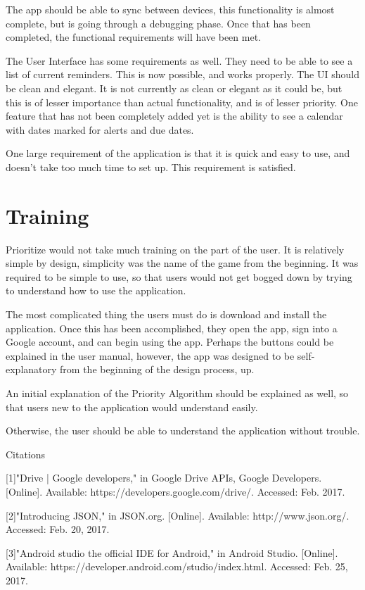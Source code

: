 \documentclass[12pt]{article}
\begin{document}
The app should be able to sync between devices, this functionality is almost complete, but is going through a debugging phase. Once that has been completed, the functional requirements will have been met.

The User Interface has some requirements as well. They need to be able to see a list of current reminders. This is now possible, and works properly. The UI should be clean and elegant. It is not currently as clean or elegant as it could be, but this is of lesser importance than actual functionality, and is of lesser priority. One feature that has not been completely added yet is the ability to see a calendar with dates marked for alerts and due dates. 

One large requirement of the application is that it is quick and easy to use, and doesn’t take too much time to set up. This requirement is satisfied. 


\section{Training}
Prioritize would not take much training on the part of the user. It is relatively simple by design, simplicity was the name of the game from the beginning. It was required to be simple to use, so that users would not get bogged down by trying to understand how to use the application.

The most complicated thing the users must do is download and install the application. Once this has been accomplished, they open the app, sign into a Google account, and can begin using the app. Perhaps the buttons could be explained in the user manual, however, the app was designed to be self-explanatory from the beginning of the design process, up. 

An initial explanation of the Priority Algorithm should be explained as well, so that users new to the application would understand easily.

Otherwise, the user should be able to understand the application without trouble.


\newpage



Citations

[1]"Drive | Google developers," in Google Drive APIs, Google Developers. [Online]. Available: https://developers.google.com/drive/. Accessed: Feb. 2017.


[2]"Introducing JSON," in JSON.org. [Online]. Available: http://www.json.org/. Accessed: Feb. 20, 2017.


[3]"Android studio the official IDE for Android," in Android Studio. [Online]. Available: https://developer.android.com/studio/index.html. Accessed: Feb. 25, 2017.
\end{document}
